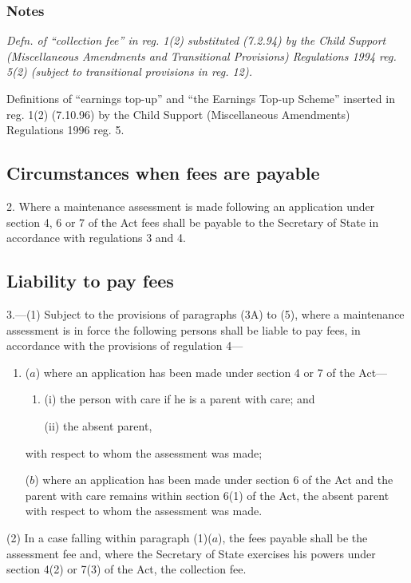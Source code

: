 \documentclass[a4paper]{article}
\newcommand\amendment[1]{\subsubsection*{Notes}{\itshape\frenchspacing\footnotesize #1 \par}}
\begin{document}
\amendment{
Defn. of ``collection fee'' in reg. 1(2) substituted (7.2.94) by the Child Support (Miscellaneous Amendments and Transitional Provisions) Regulations 1994 reg. 5(2) (subject to transitional provisions in reg. 12).

Definitions of ``earnings top-up'' and ``the Earnings Top-up Scheme'' inserted in reg. 1(2) (7.10.96) by the Child Support (Miscellaneous Amendments) Regulations 1996 reg. 5.
}

\subsection[2. Circumstances when fees are payable]{Circumstances when fees are payable}

2.  Where a maintenance assessment is made following an application under section 4, 6 or 7 of the Act fees shall be payable to the Secretary of State in accordance with regulations 3 and 4.

\subsection[3. Liability to pay fees]{Liability to pay fees}

3.—(1) Subject to the provisions of 
paragraphs (3A) to (5),  %
where a maintenance assessment is in force the following persons shall be liable to pay fees, in accordance with the provisions of regulation 4—
\begin{enumerate}\item[]
($a$) where an application has been made under section 4 or 7 of the Act—
\begin{enumerate}\item[]
(i) the person with care if he is a parent with care; and

(ii) the absent parent,
\end{enumerate}
with respect to whom the assessment was made;

($b$) where an application has been made under section 6 of the Act and the parent with care remains within section 6(1) of the Act, the absent parent with respect to whom the assessment was made.
\end{enumerate}

(2) In a case falling within paragraph (1)($a$), the fees payable shall be the assessment fee and, where the Secretary of State exercises his powers under section 4(2) or 7(3) of the Act, the collection fee.
\end{document}
